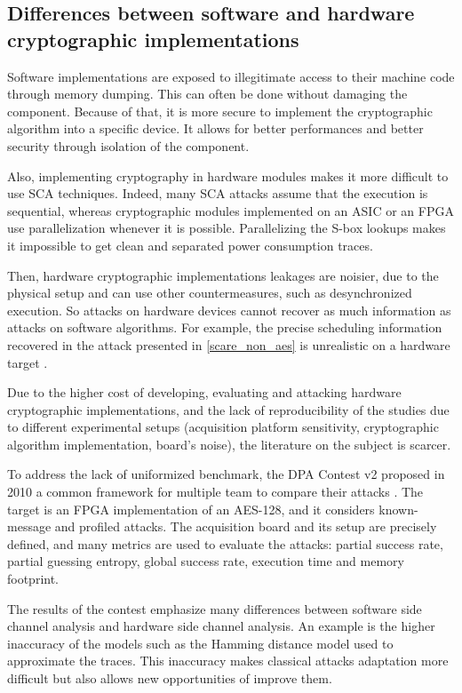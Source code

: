 \documentclass[11pt]{sdm}
\begin{document}
\subsection{Differences between software and hardware cryptographic implementations}

Software implementations are exposed to illegitimate access to their machine code through memory dumping.
This can often be done without damaging the component.
Because of that, it is more secure to implement the cryptographic algorithm into a specific device.
It allows for better performances and better security through isolation of the component.

Also, implementing cryptography in hardware modules makes it more difficult to use SCA techniques.
Indeed, many SCA attacks assume that the execution is sequential, whereas cryptographic modules implemented on an ASIC or an FPGA use parallelization whenever it is possible.
Parallelizing the S-box lookups makes it impossible to get clean and separated power consumption traces.

Then, hardware cryptographic implementations leakages are noisier, due to the physical setup and can use other countermeasures, such as desynchronized execution.
So attacks on hardware devices cannot recover as much information as attacks on software algorithms.
For example, the precise scheduling information recovered in the attack presented in \ref{scare_non_aes} is unrealistic on a hardware target \parencite{Daudigny_Ledig_Muller_Valette_2005}.


Due to the higher cost of developing, evaluating and attacking hardware cryptographic implementations, and the lack of reproducibility of the studies due to different experimental setups (acquisition platform sensitivity, cryptographic algorithm implementation, board's noise), the literature on the subject is scarcer.

To address the lack of uniformized benchmark, the DPA Contest v2 proposed in 2010 a common framework for multiple team to compare their attacks \parencite{Clavier_Danger_Duc_Elaabid_Gérard_Guilley_Heuser_Kasper_Li_Lomné_et_al_2014}.
The target is an FPGA implementation of an AES-128, and it considers known-message and profiled attacks.
The acquisition board and its setup are precisely defined, and many metrics are used to evaluate the attacks: partial success rate, partial guessing entropy, global success rate, execution time and memory footprint.

The results of the contest emphasize many differences between software side channel analysis and hardware side channel analysis.
An example is the higher inaccuracy of the models such as the Hamming distance model used to approximate the traces.
This inaccuracy makes classical attacks adaptation more difficult but also allows new opportunities of improve them.
\end{document}
